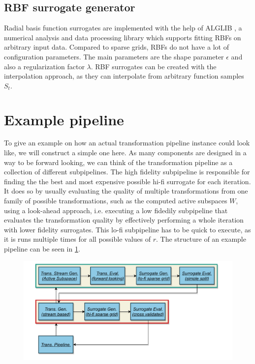 \documentclass[
  a4paper,  %
  twoside,  %
  bibliography=totoc,
  headsepline,
  cleardoublepage=empty,
  parskip=half,
  draft=false
]{scrbook}
\begin{document}
\subsection {RBF surrogate generator}

Radial basis function surrogates are implemented with the help of ALGLIB \cite{Bochkanov}, a numerical analysis and data processing library which supports fitting RBFs on arbitrary input data.
Compared to sparse grids, RBFs do not have a lot of configuration parameters.
The main parameters are the shape parameter $\epsilon$ and also a regularization factor $\lambda$.
RBF surrogates can be created with the interpolation approach, as they can interpolate from arbitrary function samples $S_t$.

\section{Example pipeline}

To give an example on how an actual transformation pipeline instance could look like, we will construct a simple one here.
As many components are designed in a way to be forward looking, we can think of the transformation pipeline as a collection of different subpipelines.
The high fidelity subpipeline is responsible for finding the the best and most expensive possible hi-fi surrogate for each iteration.
It does so by usually evaluating the quality of multiple transformations from one family of possible transformations, such as the computed active subspaces $W$, using a look-ahead approach, i.e. executing a low fidedily subpipeline that evaluates the transformation quality by effectively performing a whole iteration with lower fidelity surrogates.
This lo-fi subpipeline has to be quick to execute, as it is runs multiple times for all possible values of $r$.
The structure of an example pipeline can be seen in \cref{fig:tpex}.

\begin{mdframed}[style=style]
\begin{figure}[H]
\includegraphics[width=\textwidth]{graphics/PipelineExample.pdf}
\delimit

\label{fig:tpex}
\end{figure}
\end{mdframed}
\end{document}
